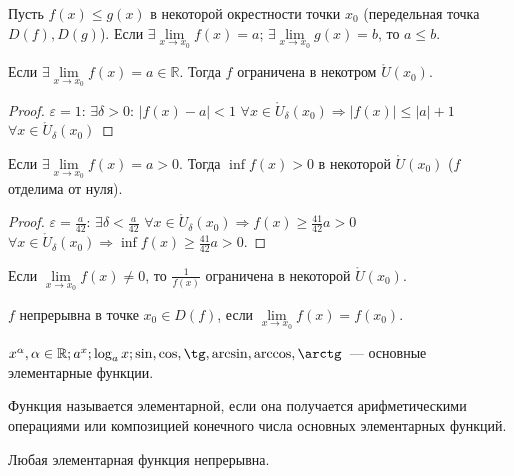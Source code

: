 \documentclass[12pt]{article}
\begin{document}
	\begin{lemma}
		Пусть $f(x) \leqslant g(x)$ в некоторой окрестности точки $x_0$ (передельная точка $D(f), D(g)$). Если $\exists \lim \limits_{x \rightarrow x_0} f(x) = a$; $\exists \lim \limits_{x \rightarrow x_0} g(x) = b$, то $a \leqslant b$.
	\end{lemma}
	\begin{lemma}[Об ограниченности]
		Если $\exists \lim \limits_{x \rightarrow x_0} f(x) = a \in \mathbb{R}$. Тогда $f$ ограничена в некотром $\mathring{U}(x_0)$.
	\end{lemma}
	\begin{proof}
		$\varepsilon = 1$: $\exists \delta > 0$: $|f(x) - a| < 1$ $\forall x \in \mathring{U}_{\delta}(x_0) \Rightarrow |f(x)| \leqslant |a| + 1$ $\forall x \in \mathring{U}_{\delta}(x_0)$
	\end{proof}
	\begin{lemma}
		Если $\exists \lim \limits_{x \rightarrow x_0} f(x) = a > 0$. Тогда $\inf f(x) > 0$ в некоторой $\mathring{U}(x_0)$ ($f$ отделима от нуля).
	\end{lemma}
	\begin{proof}
		$\varepsilon = \frac{a}{42}$: $\exists \delta < \frac{a}{42}$ $\forall x \in \mathring{U}_{\delta}(x_0) \Rightarrow f(x) \geqslant \frac{41}{42}a > 0$ $\forall x \in \mathring{U}_{\delta}(x_0) \Rightarrow \inf f(x) \geqslant \frac{41}{42}a > 0$.
	\end{proof}
	\begin{corollary}
		Если $\lim \limits_{x \rightarrow x_0} f(x) \not= 0$, то $\frac{1}{f(x)}$ ограничена в некоторой $\mathring{U}(x_0)$.
	\end{corollary}
	\begin{definition}
		$f$ непрерывна в точке $x_0 \in D(f)$, если $\lim \limits_{x \rightarrow x_0} f(x) = f(x_0)$.
	\end{definition}
	\begin{definition}
		$x^{\alpha}, \alpha \in \mathbb{R}; a^x; \log_ax; \sin, \cos, \tg, \arcsin, \arccos, \arctg$~--- основные элементарные функции.
	\end{definition}
	\begin{definition}
		Функция называется элементарной, если она получается арифметическими операциями или композицией конечного числа основных элементарных функций.
	\end{definition}
	\begin{statement}
		Любая элементарная функция непрерывна.
	\end{statement}
\end{document}
